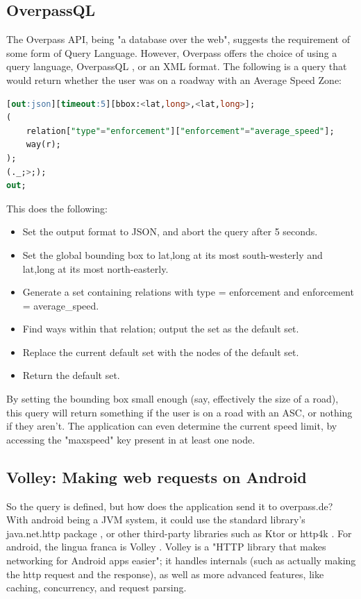 \documentclass[11pt, a4paper, notitlepage]{report}
\begin{document}
\subsection{OverpassQL}
The Overpass API, being "a database over the web", suggests the requirement of some form of Query Language. However, Overpass offers the choice of using a query language, OverpassQL \citep{overpassQLWiki}, or an XML format. The following is a query that would return whether the user was on a roadway with an Average Speed Zone:
\begin{lstlisting}[language=SQL]
[out:json][timeout:5][bbox:<lat,long>,<lat,long>];
(
    relation["type"="enforcement"]["enforcement"="average_speed"];
    way(r);
);
(._;>;);
out;
\end{lstlisting}
This does the following:
\begin{itemize}
	\item Set the output format to JSON, and abort the query after 5 seconds.
	\item Set the global bounding box to lat,long at its most south-westerly and lat,long at its most north-easterly.
	\item Generate a set containing relations with type = enforcement and enforcement = average\_speed.
	\item Find ways within that relation; output the set as the default set.
	\item Replace the current default set with the nodes of the default set.
	\item Return the default set.
\end{itemize}
By setting the bounding box small enough (say, effectively the size of a road), this query will return something if the user is on a road with an ASC, or nothing if they aren't. The application can even determine the current speed limit, by accessing the "maxspeed" key present in at least one node.

\subsection{Volley: Making web requests on Android}
So the query is defined, but how does the application send it to overpass.de? With android being a JVM system, it could use the standard library's java.net.http package \citep{javanethttp}, or other third-party libraries such as Ktor \citep{ktor} or http4k \citep{http4k}. For android, the lingua franca is Volley \citep{volley}. Volley is a "HTTP library that makes networking for Android apps easier"; it handles internals (such as actually making the http request and the response), as well as more advanced features, like caching, concurrency, and request parsing.
\end{document}

